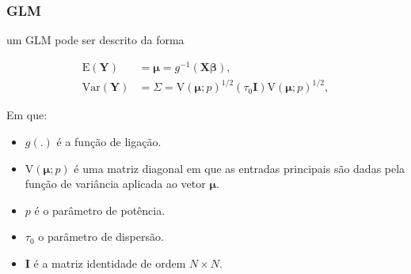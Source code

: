 \documentclass[10pt,
  aspectratio=169,
  serif,
  mathserif,
  professionalfont,
  compress,
  handout,
  ]{beamer}\usepackage[]{graphicx}\usepackage[]{color}
\begin{document}

\begin{frame}
  \frametitle{GLM}

um GLM pode ser descrito da forma

\begin{equation}
      \begin{aligned}
        \mathrm{E}(\boldsymbol{Y}) &=
         \boldsymbol{\mu} =
            g^{-1}(\boldsymbol{X} \boldsymbol{\beta}),
            \\
        \mathrm{Var}(\boldsymbol{Y}) &=
          \Sigma =
          \mathrm{V}\left(\boldsymbol{\mu}; p\right)^{1/2}\left(\tau_0\boldsymbol{I}\right)\mathrm{V}\left(\boldsymbol{\mu}; p\right)^{1/2},
      \end{aligned}
\end{equation}

Em que:

  \begin{itemize}
    \itemsep 2ex
  
  \item $g(.)$ é a função de ligação. 
  
  \item $\mathrm{V}\left(\boldsymbol{\mu}; p\right)$ é uma matriz diagonal em que as entradas principais são dadas pela função de variância aplicada ao vetor $\boldsymbol{\mu}$. 
  
  \item $p$ é o parâmetro de potência. 
  
  \item $\tau_0$ o parâmetro de dispersão. 
  
  \item $\boldsymbol{I}$ é a matriz identidade de ordem $N\times N$.
  
  \end{itemize}
\end{frame}

\end{document}
